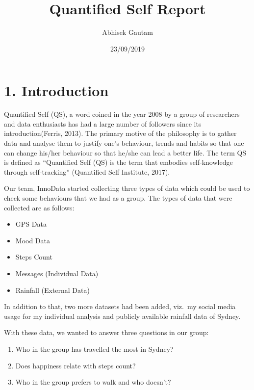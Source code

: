 \documentclass[
]{article}
\title{Quantified Self Report}
\author{Abhisek Gautam}
\date{23/09/2019}
\newenvironment{Shaded}{\begin{snugshade}}{\end{snugshade}}
\newcommand{\DataTypeTok}[1]{\textcolor[rgb]{0.13,0.29,0.53}{#1}}
\newcommand{\KeywordTok}[1]{\textcolor[rgb]{0.13,0.29,0.53}{\textbf{#1}}}
\newcommand{\NormalTok}[1]{#1}
\newcommand{\OperatorTok}[1]{\textcolor[rgb]{0.81,0.36,0.00}{\textbf{#1}}}
\newcommand{\StringTok}[1]{\textcolor[rgb]{0.31,0.60,0.02}{#1}}
\providecommand{\tightlist}{%
  \setlength{\itemsep}{0pt}\setlength{\parskip}{0pt}}
\begin{document}
\maketitle

\begin{Shaded}
\end{Shaded}

\hypertarget{introduction}{%
\section{1. Introduction}\label{introduction}}

Quantified Self (QS), a word coined in the year 2008 by a group of
researchers and data enthusiasts has had a large number of followers
since its introduction(Ferris, 2013). The primary motive of the
philosophy is to gather data and analyse them to justify one's
behaviour, trends and habits so that one can change his/her behaviour so
that he/she can lead a better life. The term QS is defined as
``Quantified Self (QS) is the term that embodies self-knowledge through
self-tracking'' (Quantified Self Institute, 2017).

Our team, InnoData started collecting three types of data which could be
used to check some behaviours that we had as a group. The types of data
that were collected are as follows:

\begin{itemize}
\tightlist
\item
  GPS Data
\item
  Mood Data
\item
  Steps Count
\item
  Messages (Individual Data)
\item
  Rainfall (External Data)
\end{itemize}

In addition to that, two more datasets had been added, viz.~my social
media usage for my individual analysis and publicly available rainfall
data of Sydney.

With these data, we wanted to answer three questions in our group:

\begin{enumerate}
\def\labelenumi{\arabic{enumi}.}
\tightlist
\item
  Who in the group has travelled the most in Sydney?
\item
  Does happiness relate with steps count?
\item
  Who in the group prefers to walk and who doesn't?
\end{enumerate}
\end{document}
